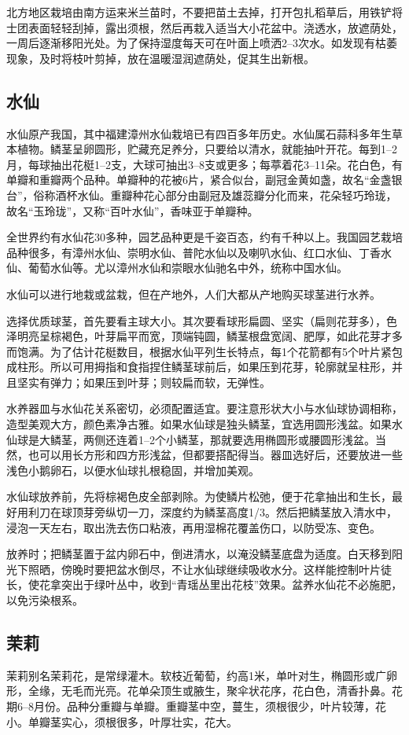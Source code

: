 \documentclass{ctexbook}
\begin{document}
北方地区栽培由南方运来米兰苗时，不要把苗土去掉，打开包扎稻草后，用铁铲将士团表面轻轻刮掉，露出须根，然后再栽入适当大小花盆中。浇透水，放遮荫处，一周后逐渐移阳光处。为了保持湿度每天可在叶面上喷洒2--3次水。如发现有枯萎现象，及时将枝叶剪掉，放在温暖湿润遮荫处，促其生出新根。
\subsection{水仙}
水仙原产我国，其中福建漳州水仙栽培已有四百多年历史。水仙属石蒜科多年生草本植物。鳞茎呈卵圆形，贮藏充足养分，只要给以清水，就能抽叶开花。每到1--2月，每球抽出花梃1--2支，大球可抽出3--8支或更多；每葶着花3--11朵。花白色，有单瓣和重瓣两个品种。单瓣种的花被6片，紧合似台，副冠金黄如盏，故名“金盏银台”，俗称酒杯水仙。重瓣种花心部分由副冠及雄蕊瓣分化而来，花朵轻巧玲珑，故名“玉玲珑”，又称“百叶水仙”，香味亚于单瓣种。

全世界约有水仙花30多种，园艺品种更是千姿百态，约有千种以上。我国园艺栽培品种很多，有漳州水仙、崇明水仙、普陀水仙以及喇叭水仙、红口水仙、丁香水仙、葡萄水仙等。尤以漳州水仙和崇眼水仙驰名中外，统称中国水仙。

水仙可以进行地栽或盆栽，但在产地外，人们大都从产地购买球茎进行水养。

选择优质球茎，首先要看主球大小。其次要看球形扁圆、坚实（扁则花芽多），色泽明亮呈棕褐色，叶芽扁平而宽，顶端钝圆，鳞茎根盘宽阔、肥厚，如此花芽才多而饱满。为了估计花梃数目，根据水仙平列生长特点，每1个花箭都有5个叶片紧包成柱形。所以可用拇指和食指捏住鳞茎球前后，如果压到花芽，轮廓就呈柱形，并且坚实有弹力；如果压到叶芽；则较扁而软，无弹性。

水养器皿与水仙花关系密切，必须配置适宜。要注意形状大小与水仙球协调相称，造型美观大方，颜色素净古雅。如果水仙球是独头鳞茎，宜选用圆形浅盆。如果水仙球是大鳞茎，两侧还连着1--2个小鳞茎，那就要选用椭圆形或腰圆形浅盆。当然，也可以用长方形和四方形浅盆，但都要搭配得当。器皿选好后，还要放进一些浅色小鹅卵石，以便水仙球扎根稳固，并增加美观。

水仙球放养前，先将棕褐色皮全部剥除。为使鳞片松弛，便于花拿抽出和生长，最好用利刀在球顶芽旁纵切一刀，深度约为鳞茎高度1/3。然后把鳞茎放入清水中，浸泡一天左右，取出洗去伤口粘液，再用湿棉花覆盖伤口，以防受冻、变色。

放养时；把鳞茎置于盆内卵石中，倒进清水，以淹没鳞茎底盘为适度。白天移到阳光下照晒，傍晚时要把盆水倒尽，不让水仙球继续吸收水分。这样能控制叶片徒长，使花拿突出于绿叶丛中，收到“青瑶丛里出花枝”效果。盆养水仙花不必施肥，以免污染根系。
\subsection{茉莉}
茉莉别名茉莉花，是常绿灌木。软枝近葡萄，约高1米，单叶对生，椭圆形或广卵形，全缘，无毛而光亮。花单朵顶生或腋生，聚伞状花序，花白色，清香扑鼻。花期6--8月份。品种分重瓣与单瓣。重瓣茎中空，蔓生，须根很少，叶片较薄，花小。单瓣茎实心，须根很多，叶厚壮实，花大。
\end{document}
